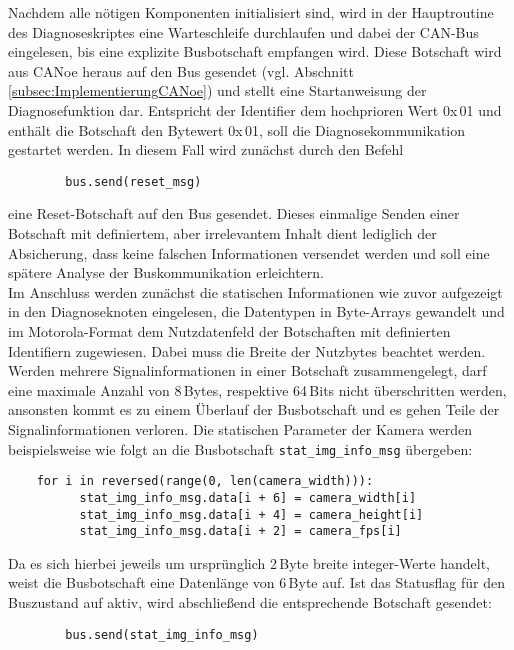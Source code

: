 Nachdem alle nötigen Komponenten initialisiert sind, wird in der Hauptroutine des Diagnoseskriptes eine Warteschleife durchlaufen und dabei der CAN-Bus eingelesen, bis eine explizite Busbotschaft empfangen wird. Diese Botschaft wird aus CANoe heraus auf den Bus gesendet (vgl. Abschnitt \ref{subsec:ImplementierungCANoe}) und stellt eine Startanweisung der Diagnosefunktion dar. Entspricht der Identifier dem hochprioren Wert 0x\,01 und enthält die Botschaft den Bytewert 0x\,01, soll die Diagnosekommunikation gestartet werden. In diesem Fall wird zunächst durch den Befehl 
\begin{addmargin}[1cm]{0cm} 
	\begin{verbatim}
		bus.send(reset_msg)
	\end{verbatim}
\end{addmargin}
eine Reset-Botschaft auf den Bus gesendet. Dieses einmalige Senden einer Botschaft mit definiertem, aber irrelevantem Inhalt dient lediglich der Absicherung, dass keine falschen Informationen versendet werden und soll eine spätere Analyse der Buskommunikation erleichtern.\\
Im Anschluss werden zunächst die statischen Informationen wie zuvor aufgezeigt in den Diagnoseknoten eingelesen, die Datentypen in Byte-Arrays gewandelt und im Motorola-Format dem Nutzdatenfeld der Botschaften mit definierten Identifiern zugewiesen. Dabei muss die Breite der Nutzbytes beachtet werden. Werden mehrere Signalinformationen in einer Botschaft zusammengelegt, darf eine maximale Anzahl von 8\,Bytes, respektive 64\,Bits nicht überschritten werden, ansonsten kommt es zu einem Überlauf der Busbotschaft und es gehen Teile der Signalinformationen verloren. Die statischen Parameter der Kamera werden beispielsweise wie folgt an die Busbotschaft \texttt{stat\_img\_info\_msg} übergeben:
\begin{addmargin}[1cm]{0cm} 
	\begin{verbatim}
	for i in reversed(range(0, len(camera_width))):
	      stat_img_info_msg.data[i + 6] = camera_width[i]
	      stat_img_info_msg.data[i + 4] = camera_height[i]
	      stat_img_info_msg.data[i + 2] = camera_fps[i]
	\end{verbatim}
\end{addmargin}
Da es sich hierbei jeweils um ursprünglich 2\,Byte breite integer-Werte handelt, weist die Busbotschaft eine Datenlänge von 6\,Byte auf. Ist das Statusflag für den Buszustand auf aktiv, wird abschließend die entsprechende Botschaft gesendet: 
\begin{addmargin}[1cm]{0cm} 
	\begin{verbatim}
		bus.send(stat_img_info_msg)
	\end{verbatim}
\end{addmargin}

